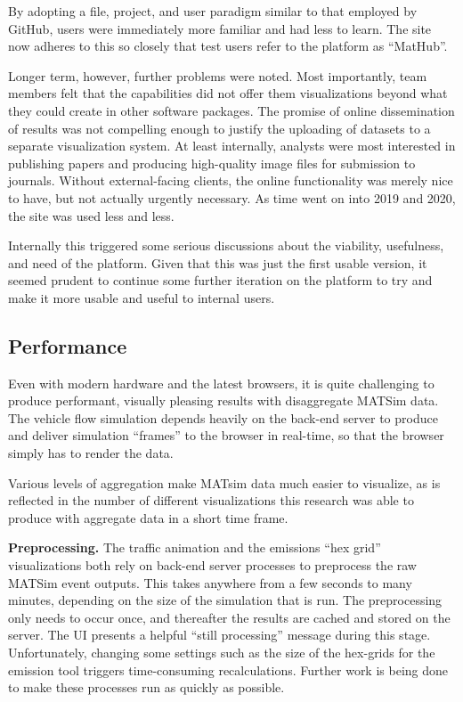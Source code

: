 By adopting a file, project, and user paradigm similar to that employed by GitHub, users were immediately more familiar and had less to learn. The site now adheres to this so closely that test users refer to the platform as ``MatHub''.

Longer term, however, further problems were noted. Most importantly, team members felt that the capabilities did not offer them visualizations beyond what they could create in other software packages. The promise of online dissemination of results was not compelling enough to justify the uploading of datasets to a separate visualization system. At least internally, analysts were most interested in publishing papers and producing high-quality image files for submission to journals. Without external-facing clients, the online functionality was merely nice to have, but not actually urgently necessary. As time went on into 2019 and 2020, the site was used less and less.

Internally this triggered some serious discussions about the viability, usefulness, and need of the platform. Given that this was just the first usable version, it seemed prudent to continue some further iteration on the platform to try and make it more usable and useful to internal users.

\hypertarget{mathub-performance}{%
\subsection{Performance}\label{performance}}

Even with modern hardware and the latest browsers, it is quite challenging to produce performant, visually pleasing results with disaggregate MATSim data. The vehicle flow simulation depends heavily on the back-end server to produce and deliver simulation ``frames'' to the browser in real-time, so that the browser simply has to render the data.

Various levels of aggregation make MATsim data much easier to visualize, as is reflected in the number of different visualizations this research was able to produce with aggregate data in a short time frame.

\textbf{Preprocessing.} The traffic animation and the emissions ``hex grid'' visualizations both rely on back-end server processes to preprocess the raw MATSim event outputs. This takes anywhere from a few seconds to many minutes, depending on the size of the simulation that is run. The preprocessing only needs to occur once, and thereafter the results are cached and stored on the server. The UI presents a helpful ``still processing'' message during this stage. Unfortunately, changing some settings such as the size of the hex-grids for the emission tool triggers time-consuming recalculations. Further work is being done to make these processes run as quickly as possible.

